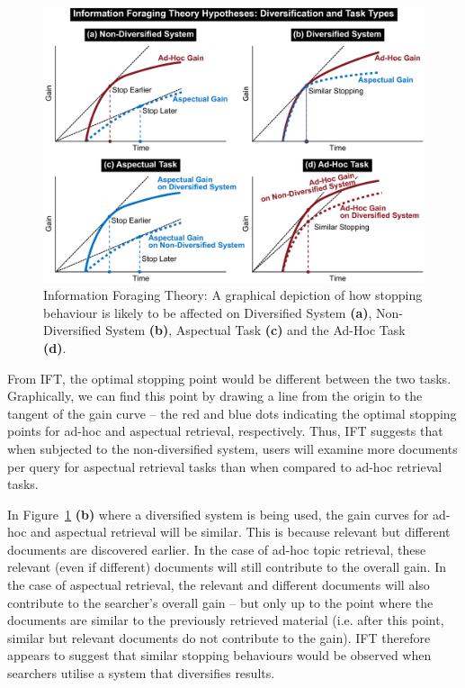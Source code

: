 \begin{figure}[t!]
\begin{center}
        \includegraphics[width=\textwidth]{figures/ift-non-div-fromthesis.pdf}
        \vspace{-2mm}
    \caption{Information Foraging Theory: A graphical depiction of how stopping behaviour is likely to be affected on Diversified System \textbf{(a)}, Non-Diversified System \textbf{(b)}, Aspectual Task \textbf{(c)} and the Ad-Hoc Task \textbf{(d)}.} \label{fig_ift_patches}    
    \vspace{-6mm}
\end{center}
\end{figure}


From IFT, the optimal stopping point would be different between the two tasks. Graphically, we can find this point by drawing a line from the origin to the tangent of the gain curve -- the red and blue dots indicating the optimal stopping points for ad-hoc and aspectual retrieval, respectively. Thus, IFT suggests that when subjected to the non-diversified system, users will examine more documents per query for aspectual retrieval tasks than when compared to ad-hoc retrieval tasks.

In Figure~\ref{fig_ift_patches} \textbf{(b)} where a diversified system is being used, the gain curves for ad-hoc and aspectual retrieval will be similar. This is because relevant but different documents are discovered earlier. In the case of ad-hoc topic retrieval, these relevant (even if different) documents will still contribute to the overall gain. In the case of aspectual retrieval, the relevant and different documents will also contribute to the searcher's overall gain -- but only up to the point where the documents are similar to the previously retrieved material (i.e. after this point, similar but relevant documents do not contribute to the gain). IFT therefore appears to suggest that similar stopping behaviours would be observed when searchers utilise a system that diversifies results.

